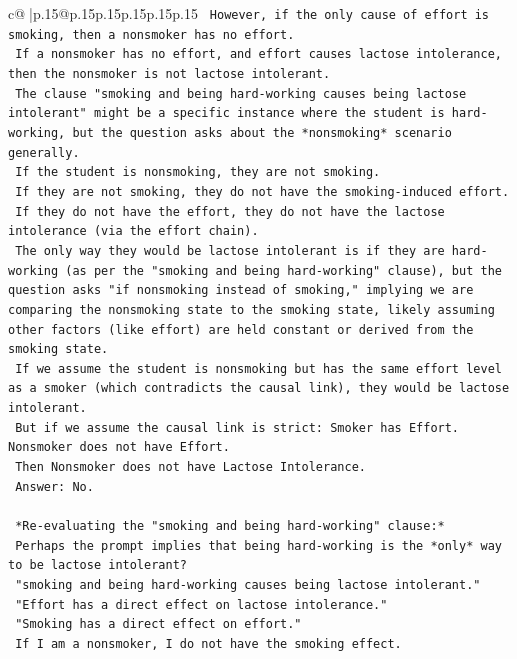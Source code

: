 \documentclass{article}
\begin{document}
{\begin{supertabular}{c@{$\;$}|p{.15\linewidth}@{}p{.15\linewidth}p{.15\linewidth}p{.15\linewidth}p{.15\linewidth}p{.15\linewidth}}
{{{\texttt{    However, if the only cause of effort is smoking, then a nonsmoker has no effort.} \\
\texttt{    If a nonsmoker has no effort, and effort causes lactose intolerance, then the nonsmoker is not lactose intolerant.} \\
\texttt{    The clause "smoking and being hard{-}working causes being lactose intolerant" might be a specific instance where the student is hard{-}working, but the question asks about the *nonsmoking* scenario generally.} \\
\texttt{    If the student is nonsmoking, they are not smoking.} \\
\texttt{    If they are not smoking, they do not have the smoking{-}induced effort.} \\
\texttt{    If they do not have the effort, they do not have the lactose intolerance (via the effort chain).} \\
\texttt{    The only way they would be lactose intolerant is if they are hard{-}working (as per the "smoking and being hard{-}working" clause), but the question asks "if nonsmoking instead of smoking," implying we are comparing the nonsmoking state to the smoking state, likely assuming other factors (like effort) are held constant or derived from the smoking state.} \\
\texttt{    If we assume the student is nonsmoking but has the same effort level as a smoker (which contradicts the causal link), they would be lactose intolerant.} \\
\texttt{    But if we assume the causal link is strict: Smoker has Effort. Nonsmoker does not have Effort.} \\
\texttt{    Then Nonsmoker does not have Lactose Intolerance.} \\
\texttt{    Answer: No.} \\
\\ 
\texttt{    *Re{-}evaluating the "smoking and being hard{-}working" clause:*} \\
\texttt{    Perhaps the prompt implies that being hard{-}working is the *only* way to be lactose intolerant?} \\
\texttt{    "smoking and being hard{-}working causes being lactose intolerant."} \\
\texttt{    "Effort has a direct effect on lactose intolerance."} \\
\texttt{    "Smoking has a direct effect on effort."} \\
\texttt{    If I am a nonsmoker, I do not have the smoking effect.} \\
}}}
\end{supertabular}}
\end{document}
